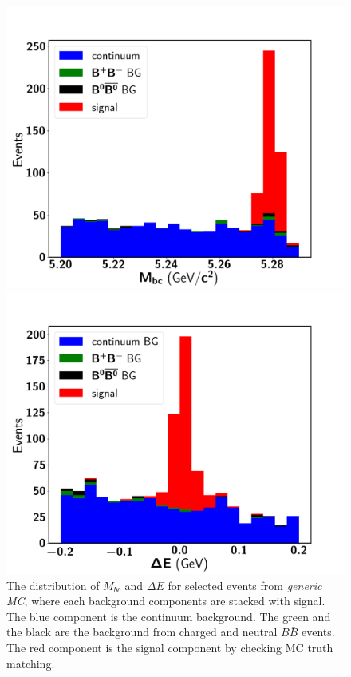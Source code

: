 \begin{figure}[htpb]
	\begin{minipage}[b]{0.5\linewidth}
		\centering 
		\includegraphics[width=1\linewidth]{figures/hist_stacked_generic_mbc_oldksfinder}
	\end{minipage}
	\begin{minipage}[b]{0.5\linewidth}
		\centering 
		\includegraphics[width=1\linewidth]{figures/hist_stacked_generic_dE_oldksfinder}
	\end{minipage}
	\caption{The distribution  of $M_{bc}$ and $\Delta E$ for selected events from \textit{generic MC}, where each background components are stacked with signal. The blue component is the continuum background. The green and the black are the background from charged and neutral $B\bar{B}$ events. The red component is the signal component by checking MC truth matching. }
	\label{fig:2Dgenstack}
\end{figure}
